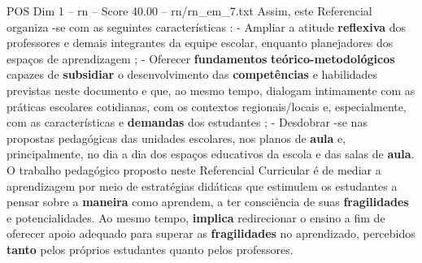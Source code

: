 \begin{textsample}{POS Dim 1 – rn – Score 40.00 – rn/rn\_em\_7.txt}
Assim, este Referencial organiza -se com as seguintes características : - Ampliar a atitude \textbf{reflexiva} dos professores e demais integrantes da equipe escolar, enquanto planejadores dos espaços de aprendizagem ; - Oferecer \textbf{fundamentos} \textbf{teórico-metodológicos} capazes de \textbf{subsidiar} o desenvolvimento das \textbf{competências} e habilidades previstas neste documento e que, ao mesmo tempo, dialogam intimamente com as práticas escolares cotidianas, com os contextos regionais/locais e, especialmente, com as características e \textbf{demandas} dos estudantes ; - Desdobrar -se nas propostas pedagógicas das unidades escolares, nos planos de \textbf{aula} e, principalmente, no dia a dia dos espaços educativos da escola e das salas de \textbf{aula}.
O trabalho pedagógico proposto neste Referencial Curricular é de mediar a aprendizagem por meio de estratégias didáticas que estimulem os estudantes a pensar sobre a \textbf{maneira} como aprendem, a ter consciência de suas \textbf{fragilidades} e potencialidades.
Ao mesmo tempo, \textbf{implica} redirecionar o ensino a fim de oferecer apoio adequado para superar as \textbf{fragilidades} no aprendizado, percebidos \textbf{tanto} pelos próprios estudantes quanto pelos professores.

\end{textsample}
